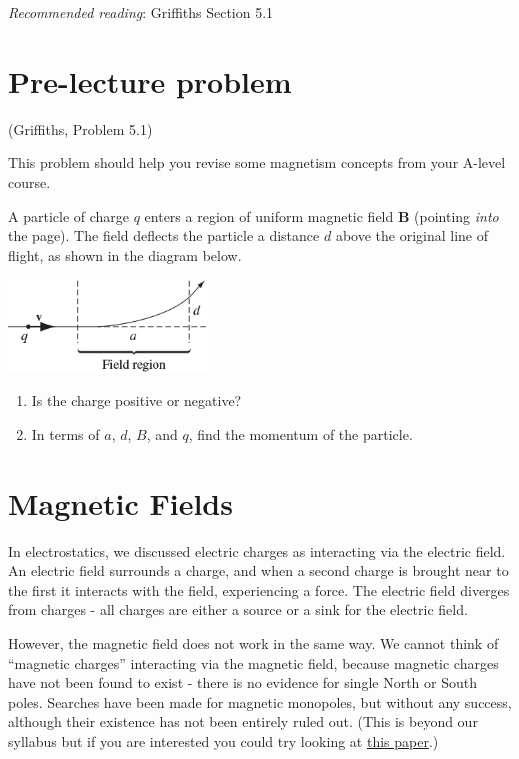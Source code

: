 \documentclass[
  letterpaper,
  DIV=11,
  numbers=noendperiod]{scrreprt}
\begin{document}
\emph{Recommended reading}: Griffiths Section 5.1

\section{Pre-lecture problem}\label{pre-lecture-problem-2}

(Griffiths, Problem 5.1)

This problem should help you revise some magnetism concepts from your
A-level course.

A particle of charge \(q\) enters a region of uniform magnetic field
\(\mathrm{\mathbf{B}}\) (pointing \emph{into} the page). The field
deflects the particle a distance \(d\) above the original line of
flight, as shown in the diagram below.

\includegraphics[width=2.08333in,height=\textheight]{Figures/L4_preprob.png}

\begin{enumerate}
\def\labelenumi{(\alph{enumi})}
\item
  Is the charge positive or negative?
\item
  In terms of \(a\), \(d\), \(B\), and \(q\), find the momentum of the
  particle.
\end{enumerate}

\section{Magnetic Fields}\label{magnetic-fields}

In electrostatics, we discussed electric charges as interacting via the
electric field. An electric field surrounds a charge, and when a second
charge is brought near to the first it interacts with the field,
experiencing a force. The electric field diverges from charges - all
charges are either a source or a sink for the electric field.

However, the magnetic field does not work in the same way. We cannot
think of ``magnetic charges'' interacting via the magnetic field,
because magnetic charges have not been found to exist - there is no
evidence for single North or South poles. Searches have been made for
magnetic monopoles, but without any success, although their existence
has not been entirely ruled out. (This is beyond our syllabus but if you
are interested you could try looking at
\href{https://royalsocietypublishing.org/doi/10.1098/rsta.2018.0328}{this
paper}.)
\end{document}
